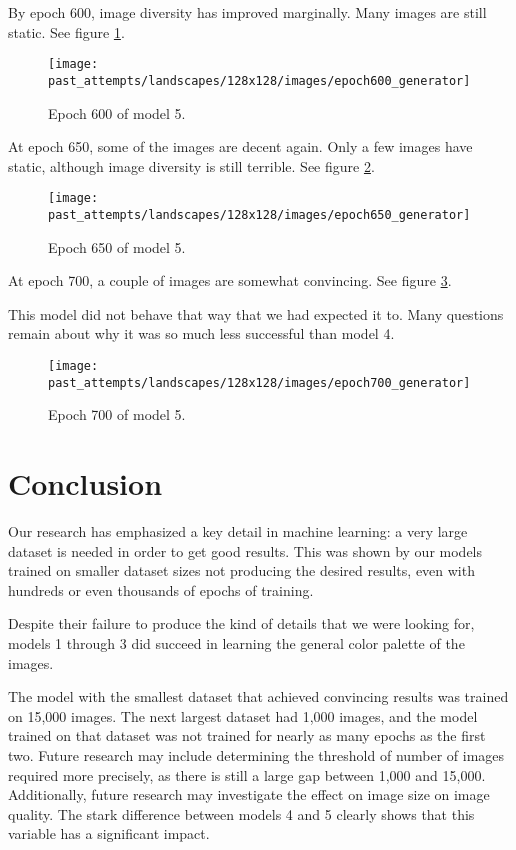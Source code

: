 \documentclass[11pt,letterpaper]{article}
\begin{document}
				By epoch 600, image diversity has improved marginally.
				Many images are still static.
				See figure \ref{fig:wa128:epoch600generator}.
				\begin{figure}
					\centering
					\texttt{[image: past\_attempts/landscapes/128x128/images/epoch600\_generator]}
					\caption{Epoch 600 of model 5.}
					\label{fig:wa128:epoch600generator}
				\end{figure}

				At epoch 650, some of the images are decent again.
				Only a few images have static, although image diversity is still terrible.
				See figure \ref{fig:wa128:epoch650generator}.
				\begin{figure}
					\centering
					\texttt{[image: past\_attempts/landscapes/128x128/images/epoch650\_generator]}
					\caption{Epoch 650 of model 5.}
					\label{fig:wa128:epoch650generator}
				\end{figure}

				At epoch 700, a couple of images are somewhat convincing.
				See figure \ref{fig:wa128:epoch700generator}.

				This model did not behave that way that we had expected it to.
				Many questions remain about why it was so much less successful than model 4.
				\begin{figure}
					\centering
					\texttt{[image: past\_attempts/landscapes/128x128/images/epoch700\_generator]}
					\caption{Epoch 700 of model 5.}
					\label{fig:wa128:epoch700generator}
				\end{figure}

	\section{Conclusion}
		Our research has emphasized a key detail in machine learning: a very large dataset is needed in order to get good results.
		This was shown by our models trained on smaller dataset sizes not producing the desired results, even with hundreds or even thousands of epochs of training.

		Despite their failure to produce the kind of details that we were looking for, models 1 through 3 did succeed in learning the general color palette of the images.

		The model with the smallest dataset that achieved convincing results was trained on 15,000 images.
		The next largest dataset had 1,000 images, and the model trained on that dataset was not trained for nearly as many epochs as the first two.
		Future research may include determining the threshold of number of images required more precisely, as there is still a large gap between 1,000 and 15,000.
		Additionally, future research may investigate the effect on image size on image quality.
		The stark difference between models 4 and 5 clearly shows that this variable has a significant impact.
\end{document}
